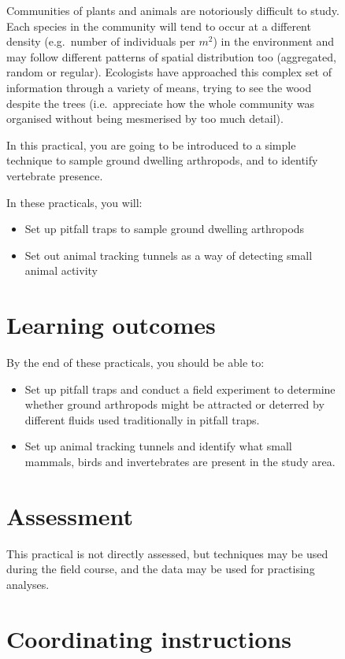 \documentclass[
  letterpaper,
  DIV=11,
  numbers=noendperiod]{scrreprt}
\providecommand{\tightlist}{%
  \setlength{\itemsep}{0pt}\setlength{\parskip}{0pt}}
\begin{document}
\begin{figure}
{Communities of plants and animals are notoriously difficult to study.
Each species in the community will tend to occur at a different density
(e.g.~number of individuals per \(m^2\)) in the environment and may
follow different patterns of spatial distribution too (aggregated,
random or regular). Ecologists have approached this complex set of
information through a variety of means, trying to see the wood despite
the trees (i.e.~appreciate how the whole community was organised without
being mesmerised by too much detail).

In this practical, you are going to be introduced to a simple technique
to sample ground dwelling arthropods, and to identify vertebrate
presence.

In these practicals, you will:

\begin{itemize}
\tightlist
\item
  Set up pitfall traps to sample ground dwelling arthropods
\item
  Set out animal tracking tunnels as a way of detecting small animal
  activity
\end{itemize}

\section{Learning outcomes}\label{learning-outcomes-1}

By the end of these practicals, you should be able to:

\begin{itemize}
\tightlist
\item
  Set up pitfall traps and conduct a field experiment to determine
  whether ground arthropods might be attracted or deterred by different
  fluids used traditionally in pitfall traps.
\item
  Set up animal tracking tunnels and identify what small mammals, birds
  and invertebrates are present in the study area.
\end{itemize}

\section{Assessment}\label{assessment}

This practical is not directly assessed, but techniques may be used
during the field course, and the data may be used for practising
analyses.

\section{Coordinating instructions}\label{coordinating-instructions}

}
\end{figure}
\end{document}
